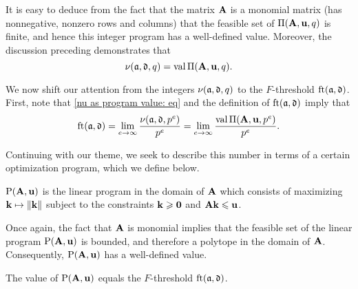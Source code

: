 \documentclass{amsart}
\begin{document}
It is easy to deduce from the fact that the matrix $\mathbf{A}$ is a monomial matrix (\ie has nonnegative, nonzero rows and columns) that the feasible set of $\Pi(\mathbf{A},\mathbf{u},q)$ is finite, and hence this integer program has a well-defined value.
Moreover, the discussion preceding  demonstrates that
\begin{equation}
\label{nu as program value: eq}
\nu(\mathfrak{a},\mathfrak{d},q) = \operatorname{val} \Pi(\mathbf{A},\mathbf{u},q).
\end{equation}

We now shift our attention from the integers $\nu(\mathfrak{a}, \mathfrak{d}, q)$ to the $F$-threshold $\operatorname{ft}(\mathfrak{a}, \mathfrak{d})$.  First, note that \eqref{nu as program value: eq} and the definition of $\operatorname{ft}(\mathfrak{a}, \mathfrak{d})$ imply that
\begin{equation}
\label{ft as limit of normalized program values: eq}
\operatorname{ft}(\mathfrak{a}, \mathfrak{d}) = \lim_{e\to\infty} \frac{\nu(\mathfrak{a},\mathfrak{d},p^e)}{p^e} = \lim_{e\to\infty} \frac{\operatorname{val} \Pi(\mathbf{A},\mathbf{u},p^e)}{p^e}.
\end{equation}

Continuing with our theme, we seek to describe this number in terms of a certain optimization program, which we define below.

\begin{definition}
\label{LP: D}
 $\mathrm{P}(\mathbf{A}, \mathbf{u})$ is the linear program in the domain of $\mathbf{A}$ which consists of maximizing $\mathbf{k} \mapsto \| \mathbf{k} \|$ subject to the constraints $\mathbf{k} \geqslant \mathbf{0}$ and $\mathbf{A} \mathbf{k} \leqslant \mathbf{u}$.
\end{definition}

Once again, the fact that $\mathbf{A}$ is monomial implies that the feasible set of the linear program $\mathrm{P}(\mathbf{A},\mathbf{u})$ is bounded, and therefore a polytope in the domain of $\mathbf{A}$.  Consequently, $\mathrm{P}(\mathbf{A},\mathbf{u})$ has a well-defined value.

\begin{proposition}
\label{ft as val LP: P}
The value of $\mathrm{P}(\mathbf{A}, \mathbf{u})$ equals the $F$-threshold $\operatorname{ft}(\mathfrak{a}, \mathfrak{d})$.
\end{proposition}
\end{document}
